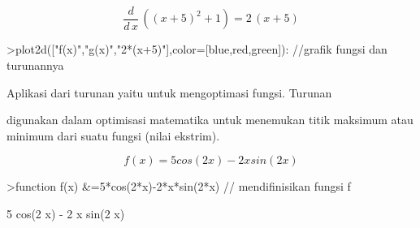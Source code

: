 \documentclass[a4paper,10pt]{article}
\begin{document}
\begin{eulernotebook}
\begin{eulercomment}
\begin{eulercomment}
\begin{eulercomment}
\begin{eulercomment}
\begin{eulercomment}
\begin{eulercomment}
\begin{eulercomment}
\begin{eulercomment}
\begin{eulercomment}
\begin{eulercomment}
\begin{eulercomment}
\begin{eulercomment}
\begin{eulercomment}
\begin{eulercomment}
\begin{eulercomment}
\begin{eulercomment}
\begin{eulercomment}
\begin{eulercomment}
\begin{eulercomment}
\begin{eulercomment}
\begin{eulercomment}
\begin{eulercomment}
\begin{euleroutput}
\end{euleroutput}
\begin{eulerformula}
\[
\frac{d}{d\,x}\,\left(\left(x+5\right)^2+1\right)=2\,\left(x+5  \right)
\]
\end{eulerformula}
\begin{eulerprompt}
>plot2d(["f(x)","g(x)","2*(x+5)"],color=[blue,red,green]): //grafik fungsi dan turunannya
\end{eulerprompt}
\begin{eulercomment}
\begin{eulercomment}
\begin{eulercomment}
\end{eulercomment}
\begin{eulerttcomment}
     Aplikasi dari turunan yaitu untuk mengoptimasi fungsi. Turunan
\end{eulerttcomment}
\begin{eulercomment}
digunakan dalam optimisasi matematika untuk menemukan titik maksimum
atau minimum dari suatu fungsi (nilai ekstrim).

\end{eulercomment}
\begin{eulerformula}
\[
f(x)=5cos(2x)-2xsin(2x)
\]
\end{eulerformula}
\begin{eulerprompt}
>function f(x) &=5*cos(2*x)-2*x*sin(2*x) // mendifinisikan fungsi f
\end{eulerprompt}
\begin{euleroutput}
  
                        5 cos(2 x) - 2 x sin(2 x)
  

\end{euleroutput}
\end{eulercomment}
\end{eulercomment}
\end{eulercomment}
\end{eulercomment}
\end{eulercomment}
\end{eulercomment}
\end{eulercomment}
\end{eulercomment}
\end{eulercomment}
\end{eulercomment}
\end{eulercomment}
\end{eulercomment}
\end{eulercomment}
\end{eulercomment}
\end{eulercomment}
\end{eulercomment}
\end{eulercomment}
\end{eulercomment}
\end{eulercomment}
\end{eulercomment}
\end{eulercomment}
\end{eulercomment}
\end{eulercomment}
\end{eulercomment}
\end{eulernotebook}
\end{document}
